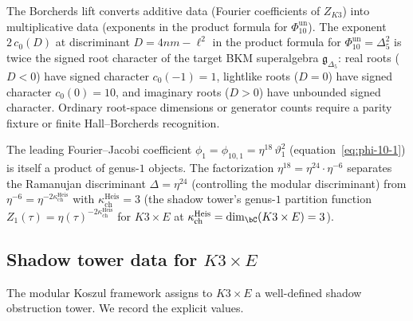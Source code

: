 \begin{remark}
\label{rem:borcherds-lift-structure}
The Borcherds lift converts additive data (Fourier
coefficients of $Z_{K3}$) into multiplicative data
(exponents in the product formula for \(\Phi_{10}^{\mathrm{un}}\)).
The exponent $2\,c_0(D)$ at discriminant $D = 4nm - \ell^2$
in the product formula for \(\Phi_{10}^{\mathrm{un}} = \Delta_5^2\) is
twice the signed root character of the target BKM superalgebra
\(\mathfrak{g}_{\Delta_5}\): real roots ($D < 0$) have
signed character \(c_0(-1) = 1\), lightlike roots ($D = 0$)
have signed character \(c_0(0) = 10\), and imaginary roots
($D > 0$) have unbounded signed character. Ordinary root-space dimensions
or generator counts require a parity fixture or finite Hall--Borcherds
recognition.

The leading Fourier--Jacobi coefficient
$\phi_1 = \phi_{10,1} = \eta^{18}\,\vartheta_1^2$
(equation~\eqref{eq:phi-10-1}) is itself a product
of genus-$1$ objects. The factorization
$\eta^{18} = \eta^{24} \cdot \eta^{-6}$ separates
the Ramanujan discriminant $\Delta = \eta^{24}$
(controlling the modular discriminant) from
$\eta^{-6} = \eta^{-2\kappa_{\mathrm{ch}}^{\mathrm{Heis}}}$ with $\kappa_{\mathrm{ch}}^{\mathrm{Heis}} = 3$
(the shadow tower's genus-$1$ partition function
$Z_1(\tau) = \eta(\tau)^{-2\kappa_{\mathrm{ch}}^{\mathrm{Heis}}}$ for
$K3 \times E$ at
$\kappa_{\mathrm{ch}}^{\mathrm{Heis}} = \dim_\bC(K3 \times E) = 3$).
\end{remark}

\subsection{Shadow tower data for \texorpdfstring{$K3 \times E$}{K3 x E}}
\label{subsec:shadow-tower-k3e}

The modular Koszul framework assigns to $K3 \times E$
a well-defined shadow obstruction tower. We record
the explicit values.


